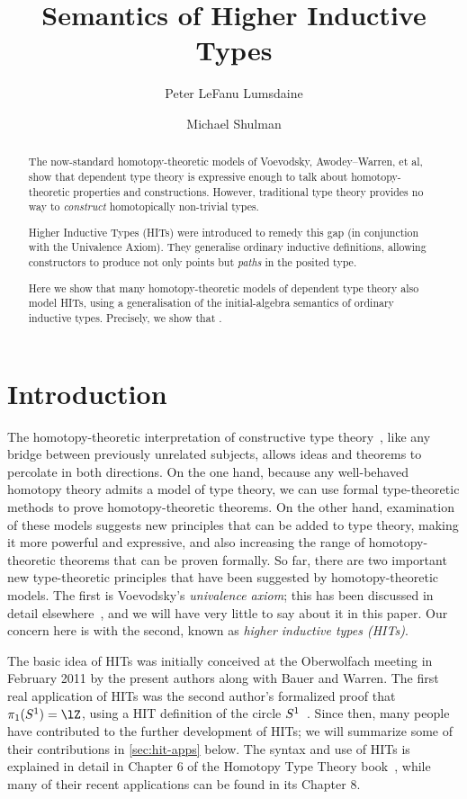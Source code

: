 \documentclass{amsart}
\title{Semantics of Higher Inductive Types}
\author{Peter LeFanu Lumsdaine}
\author{Michael Shulman}
\begin{document}
\maketitle

\begin{abstract}
The now-standard homotopy-theoretic models of Voevodsky, Awodey--Warren, et al, show that dependent type theory is expressive enough to talk about homotopy-theoretic properties and constructions.
%
However, traditional type theory provides no way to \emph{construct} homotopically non-trivial types.

Higher Inductive Types (HITs) were introduced to remedy this gap (in conjunction with the Univalence Axiom).
%
They generalise ordinary inductive definitions, allowing constructors to produce not only points but \emph{paths} in the posited type.

Here we show that many homotopy-theoretic models of dependent type theory also model HITs, using a generalisation of the initial-algebra semantics of ordinary inductive types.
%
Precisely, we show that \todo{\ldots} .
\end{abstract}


\tableofcontents

\section{Introduction}

The homotopy-theoretic interpretation of constructive type theory~\cite{...}, like any bridge between previously unrelated subjects, allows ideas and theorems to percolate in both directions.
On the one hand, because any well-behaved homotopy theory admits a model of type theory, we can use formal type-theoretic methods to prove homotopy-theoretic theorems.
On the other hand, examination of these models suggests new principles that can be added to type theory, making it more powerful and expressive, and also increasing the range of homotopy-theoretic theorems that can be proven formally.
So far, there are two important new type-theoretic principles that have been suggested by homotopy-theoretic models.
The first is Voevodsky's \emph{univalence axiom}; this has been discussed in detail elsewhere~\cite{klv:ssetmodel}, and we will have very little to say about it in this paper.
Our concern here is with the second, known as \emph{higher inductive types (HITs)}.

The basic idea of HITs was initially conceived at the Oberwolfach meeting in February 2011 by the present authors along with Bauer and Warren.
The first real application of HITs was the second author's formalized proof that $\pi_1(\circtype)=\lZ$, using a HIT definition of the circle $S^1$~\cite{ls:pi1s1}.
Since then, many people have contributed to the further development of HITs; we will summarize some of their contributions in \cref{sec:hit-apps} below.
The syntax and use of HITs is explained in detail in Chapter 6 of the Homotopy Type Theory book~\cite{hottbook}, while many of their recent applications can be found in its Chapter 8.
\end{document}
